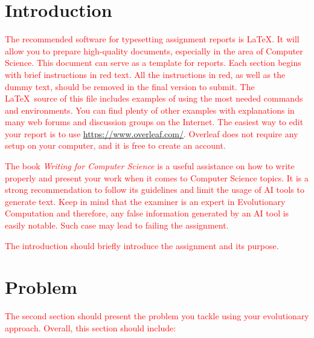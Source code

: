 \documentclass{scrartcl}
\title{\reportname}
\subtitle{An Evolutionary Algorithm for the N-Queens problem}
\author{Mahmut Osmanovic\and Isac Paulsson\and Sebastian Tuura \and Mohamed Al Khaled \and Emil Wagman}
\date{\today}
\begin{document}
\maketitle



\section{Introduction}
\label{sec:intro}

\textcolor{red}{The recommended software for typesetting assignment reports is \LaTeX. It will allow you to prepare high-quality documents, especially in the area of Computer Science. This document can serve as a template for reports. Each section begins with brief instructions in red text. All the instructions in red, as well as the dummy text, should be removed in the final version to submit. The \LaTeX\ source of this file includes examples of using the most needed commands and environments. You can find plenty of other examples with explanations in many web forums and discussion groups on the Internet. The easiest way to edit your report is to use \url{https://www.overleaf.com/}. Overleaf does not require any setup on your computer, and it is free to create an account.}

\textcolor{red}{The book \textit{Writing for Computer Science} \cite{zobel2014writing} is a useful assistance on how to write properly and present your work when it comes to Computer Science topics. It is a strong recommendation to follow its guidelines and limit the usage of AI tools to generate text. Keep in mind that the examiner is an expert in Evolutionary Computation and therefore, any false information generated by an AI tool is easily notable. Such case may lead to failing the assignment.}

\textcolor{red}{The introduction should briefly introduce the assignment and its purpose.}

\lipsum[4]


\section{Problem}
\label{sec:problem_description}

\textcolor{red}{The second section should present the problem you tackle using your evolutionary approach. Overall, this section should include:}
\end{document}
